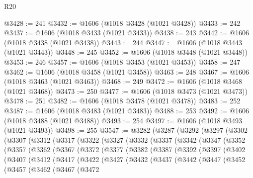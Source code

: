 \begin{lexlean}{R20}
\begin{coremodule}
@3428 := 241
@3432 := @1606 (@1018 @3428 (@1021 @3428))
@3433 := 242
@3437 := @1606 (@1018 @3433 (@1021 @3433))
@3438 := 243
@3442 := @1606 (@1018 @3438 (@1021 @3438))
@3443 := 244
@3447 := @1606 (@1018 @3443 (@1021 @3443))
@3448 := 245
@3452 := @1606 (@1018 @3448 (@1021 @3448))
@3453 := 246
@3457 := @1606 (@1018 @3453 (@1021 @3453))
@3458 := 247
@3462 := @1606 (@1018 @3458 (@1021 @3458))
@3463 := 248
@3467 := @1606 (@1018 @3463 (@1021 @3463))
@3468 := 249
@3472 := @1606 (@1018 @3468 (@1021 @3468))
@3473 := 250
@3477 := @1606 (@1018 @3473 (@1021 @3473))
@3478 := 251
@3482 := @1606 (@1018 @3478 (@1021 @3478))
@3483 := 252
@3487 := @1606 (@1018 @3483 (@1021 @3483))
@3488 := 253
@3492 := @1606 (@1018 @3488 (@1021 @3488))
@3493 := 254
@3497 := @1606 (@1018 @3493 (@1021 @3493))
@3498 := 255
@3547 := @3282
    (@3287
      (@3292
        (@3297
          (@3302
            (@3307
              (@3312
                (@3317
                  (@3322
                    (@3327
                      (@3332
                        (@3337
                          (@3342
                            (@3347
                              (@3352
                                (@3357
                                  (@3362
                                    (@3367
                                      (@3372
                                        (@3377
                                          (@3382
                                            (@3387
                                              (@3392
                                                (@3397
                                                  (@3402
                                                    (@3407
                                                      (@3412
                                                        (@3417
                                                          (@3422
                                                            (@3427
                                                              (@3432
                                                                (@3437
                                                                  (@3442
                                                                    (@3447
                                                                      (@3452
                                                                        (@3457
                                                                          (@3462
                                                                            (@3467
                                                                              (@3472

\end{coremodule}
\end{lexlean}
